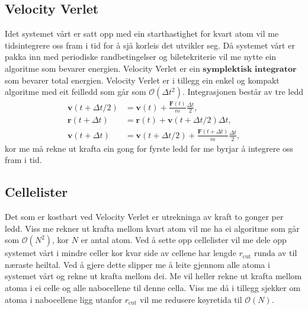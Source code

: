 \documentclass[12pt, a4paper]{article}
\theoremstyle{definition} \newtheorem*{definition}{Teorem}
\newcommand{\vb}{\mathbf}
\begin{document}
    \subsection*{Velocity Verlet}
        Idet systemet vårt er satt opp med ein starthastighet for kvart atom vil me tidsintegrere oss fram i tid for å sjå korleis det utvikler seg. Då systemet vårt er pakka
        inn med periodiske randbetingelser og biletekriterie vil me nytte ein algoritme som bevarer energien. Velocity Verlet er ein $\textbf{symplektisk integrator}$ som 
        bevarer total energien. Velocity Verlet er i tillegg ein enkel og kompakt algoritme med
        eit feilledd som går som $\mathcal{O}(\Delta t^2)$. Integrasjonen består av tre ledd
        \begin{align*}
            \vb{v}(t + \Delta t/2) &= \vb{v}(t) + \frac{\vb{F}(t)}{m}\frac{\Delta t}{2}, \\
            \vb{r}(t + \Delta t) &= \vb{r}(t) + \vb{v}(t + \Delta t/2)\Delta t, \\
            \vb{v}(t + \Delta t) &= \vb{v}(t + \Delta t/2) + \frac{\vb{F}(t + \Delta t)}{m}\frac{\Delta t}{2},
        \end{align*}
        kor me må rekne ut krafta ein gong for fyrste ledd før me byrjar å integrere oss fram i tid.

    \subsection*{Cellelister}
        Det som er kostbart ved Velocity Verlet er utrekninga av kraft to gonger per ledd. Viss me rekner ut krafta mellom kvart atom vil me ha ei algoritme som går som
        $\mathcal{O}(N^2)$, kor $N$ er antal atom. Ved å sette opp cellelister vil me dele opp systemet vårt i mindre celler kor kvar side av cellene har lengde 
        $r_{\text{cut}}$ runda av til næraste heiltal. Ved å gjere dette slipper me å leite gjennom alle atoma i systemet vårt og rekne ut krafta mellom dei. Me vil 
        heller rekne ut krafta mellom atoma i ei celle og alle nabocellene til denne cella. Viss me då i tillegg sjekker om atoma i nabocellene ligg utanfor
        $r_{\text{cut}}$ vil me redusere køyretida til $\mathcal{O}(N)$.
\end{document}
